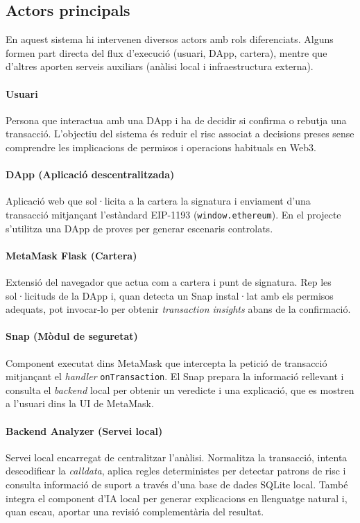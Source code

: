 \subsection{Actors principals}

En aquest sistema hi intervenen diversos actors amb rols diferenciats. Alguns formen part directa del flux d’execució (usuari, DApp, cartera), mentre que d’altres aporten serveis auxiliars (anàlisi local i infraestructura externa).


\paragraph{Usuari}
Persona que interactua amb una DApp i ha de decidir si confirma o rebutja una transacció. L’objectiu del sistema és reduir el risc associat a decisions preses sense comprendre les implicacions de permisos i operacions habituals en Web3.

\paragraph{DApp (Aplicació descentralitzada)}
Aplicació web que sol·licita a la cartera la signatura i enviament d’una transacció mitjançant l’estàndard EIP-1193 (\texttt{window.ethereum}). En el projecte s’utilitza una DApp de proves per generar escenaris controlats.

\paragraph{MetaMask Flask (Cartera)}
Extensió del navegador que actua com a cartera i punt de signatura. Rep les sol·licituds de la DApp i, quan detecta un Snap instal·lat amb els permisos adequats, pot invocar-lo per obtenir \emph{transaction insights} abans de la confirmació.

\paragraph{Snap (Mòdul de seguretat)}
Component executat dins MetaMask que intercepta la petició de transacció mitjançant el \textit{handler} \texttt{onTransaction}. El Snap prepara la informació rellevant i consulta el \textit{backend} local per obtenir un veredicte i una explicació, que es mostren a l’usuari dins la UI de MetaMask.


\paragraph{Backend Analyzer (Servei local)} Servei local encarregat de centralitzar l’anàlisi. Normalitza la transacció, intenta descodificar la \textit{calldata}, aplica regles deterministes per detectar patrons de risc i consulta informació de suport a través d’una base de dades SQLite local. També integra el component d’IA local per generar explicacions en llenguatge natural i, quan escau, aportar una revisió complementària del resultat.


